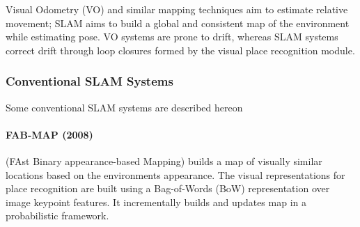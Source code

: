 Visual Odometry (VO) and similar mapping techniques aim to estimate
relative movement; SLAM aims to build a global and consistent map of
the environment while estimating pose. VO systems are prone to drift,
whereas SLAM systems correct drift through loop closures formed by the
visual place recognition module.

\subsubsection{Conventional SLAM Systems}

Some conventional SLAM systems are described hereon



\paragraph{FAB-MAP (2008) \cite{Cummins2008FABMAPPL}} (FAst Binary
appearance-based Mapping) builds a map of visually similar locations
based on the environments appearance. The visual representations for
place recognition are built using a Bag-of-Words (BoW) representation
over image keypoint features. It incrementally builds and updates map
in a probabilistic framework.


